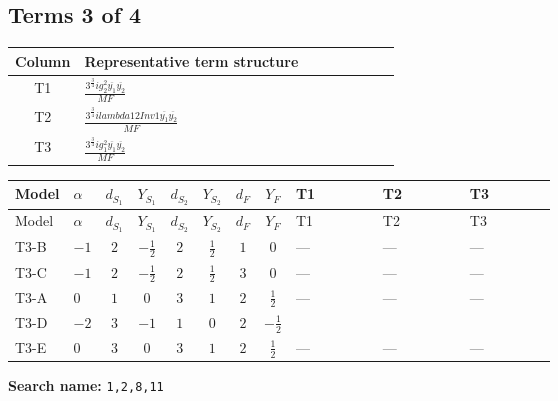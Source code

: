 \documentclass[8pt]{article}
\begin{document}
\begin{landscape}
\subsection*{Terms 3 of 4}
\begin{center}
\begin{tabular}{@{}c >{\raggedright\arraybackslash}p{0.82\linewidth}@{}}
\toprule
Column & Representative term structure \\
\midrule
T1 & \(\displaystyle \frac{3^{\frac{3}{4}} i g_{2}^{2} \overline{y_{1}} \overline{y_{2}}}{MF}\) \\
\midrule
T2 & \(\displaystyle \frac{3^{\frac{3}{4}} i lambda12Inv1 \overline{y_{1}} \overline{y_{2}}}{MF}\) \\
\midrule
T3 & \(\displaystyle \frac{3^{\frac{3}{4}} i g_{1}^{2} \overline{y_{1}} \overline{y_{2}}}{MF}\) \\
\midrule
\bottomrule
\end{tabular}
\end{center}
\smallskip
\tiny
\begin{longtable}{@{}llcccccc >{\raggedright\arraybackslash}p{0.21\linewidth} >{\raggedright\arraybackslash}p{0.21\linewidth} >{\raggedright\arraybackslash}p{0.21\linewidth}@{}}
\toprule
Model & $\alpha$ & $d_{S_1}$ & $Y_{S_1}$ & $d_{S_2}$ & $Y_{S_2}$ & $d_F$ & $Y_F$ & T1 & T2 & T3 \\
\midrule
\endfirsthead
\toprule
Model & $\alpha$ & $d_{S_1}$ & $Y_{S_1}$ & $d_{S_2}$ & $Y_{S_2}$ & $d_F$ & $Y_F$ & T1 & T2 & T3 \\
\midrule
\endhead
T3-B & $-1$ & $2$ & $-\frac{1}{2}$ & $2$ & $\frac{1}{2}$ & $1$ & $0$ & --- & --- & --- \\
\midrule
T3-C & $-1$ & $2$ & $-\frac{1}{2}$ & $2$ & $\frac{1}{2}$ & $3$ & $0$ & --- & --- & --- \\
\midrule
T3-A & $0$ & $1$ & $0$ & $3$ & $1$ & $2$ & $\frac{1}{2}$ & --- & --- & --- \\
\midrule
T3-D & $-2$ & $3$ & $-1$ & $1$ & $0$ & $2$ & $-\frac{1}{2}$ & \scriptsize\adjustbox{max width=\linewidth}{$\begin{gathered} - \frac{25 \cdot 3^{\frac{3}{4}} i g_{2}^{2} \overline{y_{1}} \overline{y_{2}}}{24 MF}\end{gathered}$} & \scriptsize\adjustbox{max width=\linewidth}{$\begin{gathered} - \frac{3^{\frac{3}{4}} i lambda12Inv1 \overline{y_{1}} \overline{y_{2}}}{6 MF}\end{gathered}$} & \scriptsize\adjustbox{max width=\linewidth}{$\begin{gathered} - \frac{3^{\frac{3}{4}} i g_{1}^{2} \overline{y_{1}} \overline{y_{2}}}{8 MF}\end{gathered}$} \\
\midrule
T3-E & $0$ & $3$ & $0$ & $3$ & $1$ & $2$ & $\frac{1}{2}$ & --- & --- & --- \\
\midrule
\bottomrule
\end{longtable}
\clearpage
\noindent\textbf{Search name: }\texttt{1,2,8,11}\par\smallskip

\end{landscape}
\end{document}
